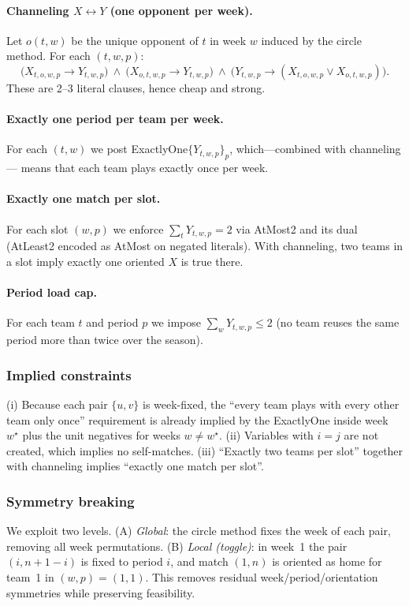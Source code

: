 \documentclass{article}
\begin{document}
\paragraph{Channeling $X\leftrightarrow Y$ (one opponent per week).}
Let $o(t,w)$ be the unique opponent of $t$ in week $w$ induced by the circle method. For each $(t,w,p)$:
\[
\bigl(X_{t,o,w,p}\!\!\rightarrow\! Y_{t,w,p}\bigr)\ \wedge\ \bigl(X_{o,t,w,p}\!\!\rightarrow\! Y_{t,w,p}\bigr)\ \wedge\ \bigl(Y_{t,w,p}\!\!\rightarrow\! (X_{t,o,w,p}\vee X_{o,t,w,p})\bigr).
\]
These are 2–3 literal clauses, hence cheap and strong.

\paragraph{Exactly one period per team per week.}
For each $(t,w)$ we post \textsf{ExactlyOne}$\{Y_{t,w,p}\}_p$, which—combined with channeling—
means that each team plays exactly once per week.

\paragraph{Exactly one match per slot.}
For each slot $(w,p)$ we enforce $\sum_t Y_{t,w,p}=2$ via \textsf{AtMost2} and its dual
(\textsf{AtLeast2} encoded as \textsf{AtMost} on negated literals). With channeling, two teams
in a slot imply exactly one oriented $X$ is true there.

\paragraph{Period load cap.}
For each team $t$ and period $p$ we impose $\sum_w Y_{t,w,p}\le 2$ (no team reuses the
same period more than twice over the season).

\subsubsection*{Implied constraints}
(i) Because each pair $\{u,v\}$ is week-fixed, the ``every team plays with every other team only once'' requirement is already
implied by the \textsf{ExactlyOne} inside week $w^\star$ plus the unit negatives for weeks $w\neq w^\star$.
(ii) Variables with $i=j$ are not created, which implies no self-matches.
(iii) ``Exactly two teams per slot'' together with channeling implies ``exactly one match per slot''.

\subsubsection*{Symmetry breaking}
We exploit two levels. (A) \emph{Global}: the circle method fixes the week of each pair, removing
all week permutations. (B) \emph{Local (toggle)}: in week~1 the pair $(i,n\!+\!1\!-\!i)$ is fixed
to period $i$, and match $(1,n)$ is oriented as home for team~1 in $(w,p)=(1,1)$. This removes
residual week/period/orientation symmetries while preserving feasibility.
\end{document}
